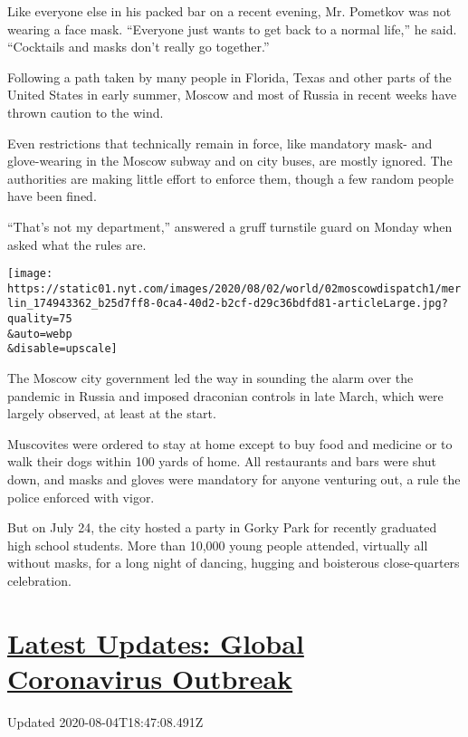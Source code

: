 Like everyone else in his packed bar on a recent evening, Mr. Pometkov
was not wearing a face mask. ``Everyone just wants to get back to a
normal life,'' he said. ``Cocktails and masks don't really go
together.''

Following a path taken by many people in Florida, Texas and other parts
of the United States in early summer, Moscow and most of Russia in
recent weeks have thrown caution to the wind.

Even restrictions that technically remain in force, like mandatory mask-
and glove-wearing in the Moscow subway and on city buses, are mostly
ignored. The authorities are making little effort to enforce them,
though a few random people have been fined.

``That's not my department,'' answered a gruff turnstile guard on Monday
when asked what the rules are.

\texttt{[image: https://static01.nyt.com/images/2020/08/02/world/02moscowdispatch1/merlin\_174943362\_b25d7ff8-0ca4-40d2-b2cf-d29c36bdfd81-articleLarge.jpg?quality=75\\\&auto=webp\\\&disable=upscale]}

The Moscow city government led the way in sounding the alarm over the
pandemic in Russia and imposed draconian controls in late March, which
were largely observed, at least at the start.

Muscovites were ordered to stay at home except to buy food and medicine
or to walk their dogs within 100 yards of home. All restaurants and bars
were shut down, and masks and gloves were mandatory for anyone venturing
out, a rule the police enforced with vigor.

But on July 24, the city hosted a party in Gorky Park for recently
graduated high school students. More than 10,000 young people attended,
virtually all without masks, for a long night of dancing, hugging and
boisterous close-quarters celebration.

\hypertarget{latest-updates-global-coronavirus-outbreak}{%
\section{\texorpdfstring{\href{https://www.nytimes.com/2020/08/04/world/coronavirus-cases.html?action=click\&pgtype=Article\&state=default\&region=MAIN_CONTENT_1\&context=storylines_live_updates}{Latest
Updates: Global Coronavirus
Outbreak}}{Latest Updates: Global Coronavirus Outbreak}}\label{latest-updates-global-coronavirus-outbreak}}

Updated 2020-08-04T18:47:08.491Z

